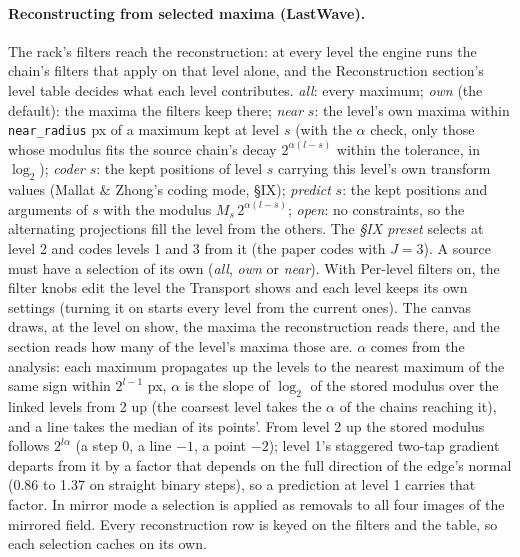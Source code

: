 \documentclass[10pt]{article}
\begin{document}
\paragraph{Reconstructing from selected maxima (LastWave).} The rack's filters reach the
reconstruction: at every level the engine runs the chain's filters that apply on that level
alone, and the Reconstruction section's level table
decides what each level contributes. \emph{all}: every maximum; \emph{own} (the default): the maxima
the filters keep there; \emph{near} $s$: the level's own maxima within \texttt{near\_radius} px of a
maximum kept at level $s$ (with the $\alpha$ check, only those whose modulus fits the source chain's
decay $2^{\alpha(l-s)}$ within the tolerance, in $\log_2$); \emph{coder} $s$: the kept positions of
level $s$ carrying this level's own transform values (Mallat \& Zhong's coding mode, \S IX);
\emph{predict} $s$: the kept positions and arguments of $s$ with the modulus $M_s\,2^{\alpha(l-s)}$;
\emph{open}: no constraints, so the alternating projections fill the level from the others. The
\emph{\S IX preset} selects at level 2 and codes levels 1 and 3 from it (the paper codes with $J=3$).
A source must have a selection of its own (\emph{all}, \emph{own} or \emph{near}). With Per-level
filters on, the filter knobs edit the level the Transport shows and each level keeps its own
settings (turning it on starts every level from the current ones). The canvas draws, at the level
on show, the maxima the reconstruction reads there, and the section reads how many of the level's
maxima those are. $\alpha$ comes from the analysis: each maximum propagates up the levels to the
nearest maximum of the same sign within $2^{l-1}$ px, $\alpha$ is the slope of $\log_2$ of the
stored modulus over the linked levels from 2 up (the coarsest level takes the $\alpha$ of the chains
reaching it), and a line takes the median of its points'. From level 2 up the stored modulus
follows $2^{l\alpha}$ (a step 0, a line $-1$, a point $-2$); level 1's staggered two-tap gradient
departs from it by a factor that depends on the full direction of the edge's normal (0.86 to 1.37 on
straight binary steps), so a prediction at level 1 carries that factor. In mirror mode a selection
is applied as removals to all four images of the mirrored field. Every reconstruction row is keyed
on the filters and the table, so each selection caches on its own.
\end{document}
